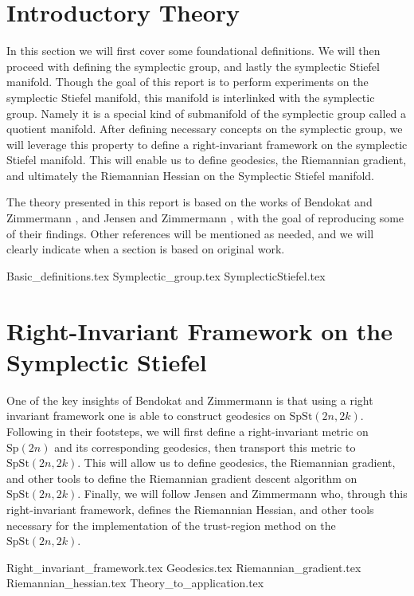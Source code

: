 \section{Introductory Theory}\label{sec:Introductory_theory}
In this section we will first cover some foundational definitions. We will then proceed with defining the symplectic group, and lastly the symplectic Stiefel manifold. Though the goal of this report is to perform experiments on the symplectic Stiefel manifold, this manifold is interlinked with the symplectic group. Namely it is a special kind of submanifold of the symplectic group called a quotient manifold. After defining necessary concepts on the symplectic group, we will leverage this property to define a right-invariant framework on the symplectic Stiefel manifold. This will enable us to define geodesics, the Riemannian gradient, and ultimately the Riemannian Hessian on the Symplectic Stiefel manifold. 

The theory presented in this report is based on the works of Bendokat and Zimmermann \cite{BendokatZimmermann2021}, and Jensen and Zimmermann \cite{JensenZimmermann2024}, with the goal of reproducing some of their findings. Other references will be mentioned as needed, and we will clearly indicate when a section is based on original work. 

{Basic_definitions.tex}
{Symplectic_group.tex}
{SymplecticStiefel.tex}

\section{Right-Invariant Framework on the Symplectic Stiefel}\label{sec:right_invariant_framework}
One of the key insights of Bendokat and Zimmermann \cite[p.~11]{BendokatZimmermann2021} is that using a right invariant framework one is able to construct geodesics on $\mathrm{SpSt}(2n, 2k)$. Following in their footsteps, we will first define a right-invariant metric on $\mathrm{Sp}(2n)$ and its corresponding geodesics, then transport this metric to $\mathrm{SpSt}(2n, 2k)$. This will allow us to define geodesics, the Riemannian gradient, and other tools to define the Riemannian gradient descent algorithm on $\mathrm{SpSt}(2n, 2k)$. Finally, we will follow Jensen and Zimmermann \cite[p.~10]{JensenZimmermann2024} who, through this right-invariant framework, defines the Riemannian Hessian, and other tools necessary for the implementation of the trust-region method on the $\mathrm{SpSt}(2n, 2k)$. 

{Right_invariant_framework.tex}
{Geodesics.tex}
{Riemannian_gradient.tex}
{Riemannian_hessian.tex}
{Theory_to_application.tex}
